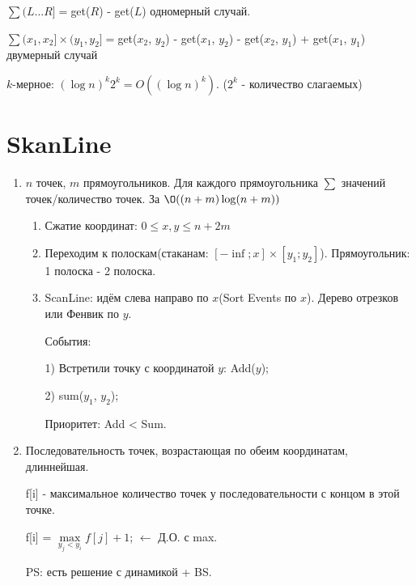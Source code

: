 $\sum(L \dots R] = $get($R$) - get($L$) одномерный случай.

$\sum(x_1, x_2]\times(y_1, y_2] = $get($x_2$, $y_2$) - get($x_1$, $y_2$) - get($x_2$, $y_1$) + get($x_1$, $y_1$) двумерный случай

$k$-мерное: $(\log n)^k2^k = O((\log n)^k)$. ($2^k$ - количество слагаемых)

\section{SkanLine}

\begin{enumerate}
	\item $n$ точек, $m$ прямоугольников. Для каждого прямоугольника  $\sum$ значений точек/количество точек. За $\O((n + m)\log(n + m))$
	\begin{enumerate}
		\item Сжатие координат: $0 \le x, y \le n + 2m$
		\item Переходим к полоскам(стаканам: $[-\inf; x]\times[y_1; y_2]$). Прямоугольник: 1 полоска - 2 полоска.
		\item ScanLine: идём слева направо по $x$(Sort Events по $x$). Дерево отрезков или Фенвик по $y$.

		События:

		1) Встретили точку с координатой $y$: Add($y$);

		2) sum($y_1$, $y_2$);

		Приоритет: Add < Sum.
	\end{enumerate}
	\item Последовательность точек, возрастающая по обеим координатам, длиннейшая.

	f[i] - максимальное количество точек у последовательности с концом в этой точке.

	f[i] = $\max\limits_{y_j < y_i} f[j] + 1$; $\leftarrow$ Д.О. с max.

	PS: есть решение с динамикой + BS.
\end{enumerate}